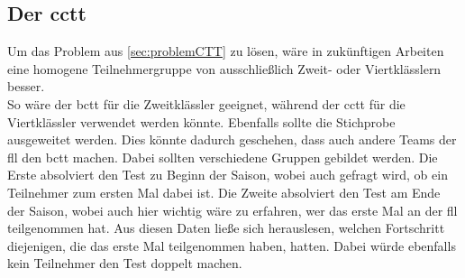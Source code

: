 \subsection*{Der \acrlong{cctt}}
Um das Problem aus \ref{sec:problemCTT} zu lösen, wäre in zukünftigen Arbeiten eine homogene Teilnehmergruppe von ausschließlich Zweit- oder Viertklässlern besser.\\
So wäre der \acrshort{bctt} für die Zweitklässler geeignet, während der \acrshort{cctt} für die Viertklässler verwendet werden könnte.
Ebenfalls sollte die Stichprobe ausgeweitet werden. Dies könnte dadurch geschehen, dass auch andere Teams der \acrshort{fll} den \acrshort{bctt} machen. Dabei sollten verschiedene Gruppen gebildet werden. Die Erste absolviert den Test zu Beginn der Saison, wobei auch gefragt wird, ob ein Teilnehmer zum ersten Mal dabei ist. Die Zweite absolviert den Test am Ende der Saison, wobei auch hier wichtig wäre zu erfahren, wer das erste Mal an der \acrshort{fll} teilgenommen hat. Aus diesen Daten ließe sich herauslesen, welchen Fortschritt diejenigen, die das erste Mal teilgenommen haben, hatten. Dabei würde ebenfalls kein Teilnehmer den Test doppelt machen.



